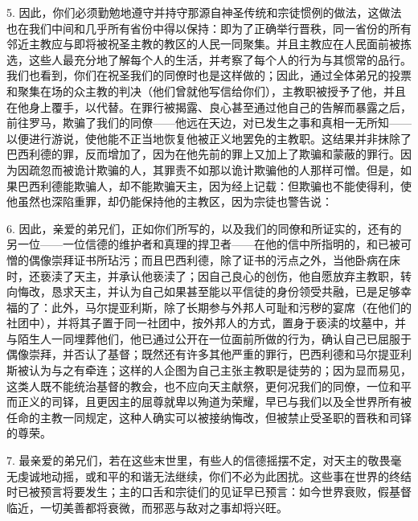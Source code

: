 5. 因此，你们必须勤勉地遵守并持守那源自神圣传统和宗徒惯例的做法，这做法也在我们中间和几乎所有省份中得以保持：即为了正确举行晋秩，同一省份的所有邻近主教应与即将被祝圣主教的教区的人民一同聚集。并且主教应在人民面前被拣选，这些人最充分地了解每个人的生活，并考察了每个人的行为与其惯常的品行。我们也看到，你们在祝圣我们的同僚时也是这样做的；因此，通过全体弟兄的投票和聚集在场的众主教的判决（他们曾就他写信给你们），主教职被授予了他，并且在他身上覆手，以代替。在罪行被揭露、良心甚至通过他自己的告解而暴露之后，前往罗马，欺骗了我们的同僚——他远在天边，对已发生之事和真相一无所知——以便进行游说，使他能不正当地恢复他被正义地罢免的主教职。这结果并非抹除了巴西利德的罪，反而增加了，因为在他先前的罪上又加上了欺骗和蒙蔽的罪行。因为因疏忽而被诡计欺骗的人，其罪责不如那以诡计欺骗他的人那样可憎。但是，如果巴西利德能欺骗人，却不能欺骗天主，因为经上记载：但欺骗也不能使得利，使他虽然也深陷重罪，却仍能保持他的主教区，因为宗徒也警告说：\par

6. 因此，亲爱的弟兄们，正如你们所写的，以及我们的同僚和所证实的，还有的另一位——一位信德的维护者和真理的捍卫者——在他的信中所指明的，和已被可憎的偶像崇拜证书所玷污；而且巴西利德，除了证书的污点之外，当他卧病在床时，还亵渎了天主，并承认他亵渎了；因自己良心的创伤，他自愿放弃主教职，转向悔改，恳求天主，并认为自己如果甚至能以平信徒的身份领受共融，已是足够幸福的了：此外，马尔提亚利斯，除了长期参与外邦人可耻和污秽的宴席（在他们的社团中），并将其子置于同一社团中，按外邦人的方式，置身于亵渎的坟墓中，并与陌生人一同埋葬他们，他已通过公开在一位面前所做的行为，确认自己已屈服于偶像崇拜，并否认了基督；既然还有许多其他严重的罪行，巴西利德和马尔提亚利斯被认为与之有牵连；这样的人企图为自己主张主教职是徒劳的；因为显而易见，这类人既不能统治基督的教会，也不应向天主献祭，更何况我们的同僚，一位和平而正义的司铎，且更因主的屈尊就卑以殉道为荣耀，早已与我们以及全世界所有被任命的主教一同规定，这种人确实可以被接纳悔改，但被禁止受圣职的晋秩和司铎的尊荣。\par

7. 最亲爱的弟兄们，若在这些末世里，有些人的信德摇摆不定，对天主的敬畏毫无虔诚地动摇，或和平的和谐无法继续，你们不必为此困扰。这些事在世界的终结时已被预言将要发生；主的口舌和宗徒们的见证早已预言：如今世界衰败，假基督临近，一切美善都将衰微，而邪恶与敌对之事却将兴旺。\par

